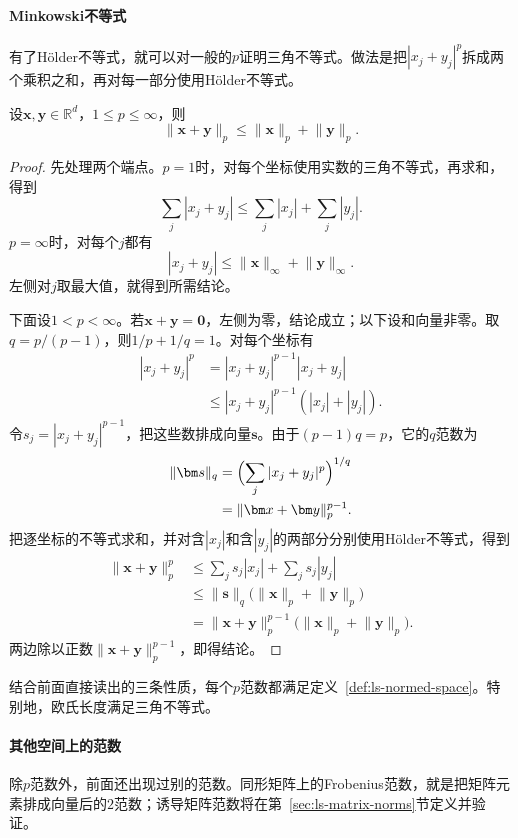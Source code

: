 \paragraph{Minkowski不等式}
有了Hölder不等式，就可以对一般的$p$证明三角不等式。做法是把$|x_j+y_j|^p$拆成两个乘积之和，再对每一部分使用Hölder不等式。
\begin{theorem}[有限维Minkowski不等式]
\label{thm:linear-algebra-minkowski}
设$\bm x,\bm y\in\mathbb R^d$，$1\leq p\leq\infty$，则
\[
 \lVert\bm x+\bm y\rVert_p\leq\lVert\bm x\rVert_p+\lVert\bm y\rVert_p.
\]
\end{theorem}
\begin{proof}
先处理两个端点。$p=1$时，对每个坐标使用实数的三角不等式，再求和，得到
\[
 \sum_j|x_j+y_j|\leq\sum_j|x_j|+\sum_j|y_j|.
\]
$p=\infty$时，对每个$j$都有
\[
 |x_j+y_j|\leq\lVert\bm x\rVert_\infty+\lVert\bm y\rVert_\infty.
\]
左侧对$j$取最大值，就得到所需结论。

下面设$1<p<\infty$。若$\bm x+\bm y=\bm0$，左侧为零，结论成立；以下设和向量非零。取$q=p/(p-1)$，则$1/p+1/q=1$。对每个坐标有
\[
 \begin{aligned}
 |x_j+y_j|^p
 &=|x_j+y_j|^{p-1}|x_j+y_j|\\
 &\leq |x_j+y_j|^{p-1}(|x_j|+|y_j|).
 \end{aligned}
\]
令$s_j=|x_j+y_j|^{p-1}$，把这些数排成向量$\bm s$。由于$(p-1)q=p$，它的$q$范数为
\[
 \begin{aligned}
 \lVert\bm s\rVert_q
 &=\Bigl(\sum_j|x_j+y_j|^p\Bigr)^{1/q}\\
 &=\lVert\bm x+\bm y\rVert_p^{p-1}.
 \end{aligned}
\]
把逐坐标的不等式求和，并对含$|x_j|$和含$|y_j|$的两部分分别使用Hölder不等式，得到
\[
 \begin{aligned}
 \lVert\bm x+\bm y\rVert_p^p
 &\leq\sum_js_j|x_j|+\sum_js_j|y_j|\\
 &\leq\lVert\bm s\rVert_q
       \bigl(\lVert\bm x\rVert_p+\lVert\bm y\rVert_p\bigr)\\
 &=\lVert\bm x+\bm y\rVert_p^{p-1}
       \bigl(\lVert\bm x\rVert_p+\lVert\bm y\rVert_p\bigr).
 \end{aligned}
\]
两边除以正数$\lVert\bm x+\bm y\rVert_p^{p-1}$，即得结论。
\end{proof}
结合前面直接读出的三条性质，每个$p$范数都满足定义~\ref{def:ls-normed-space}。特别地，欧氏长度满足三角不等式。

\paragraph{其他空间上的范数}
除$p$范数外，前面还出现过别的范数。同形矩阵上的Frobenius范数，就是把矩阵元素排成向量后的$2$范数；诱导矩阵范数将在第~\ref{sec:ls-matrix-norms}节定义并验证。

